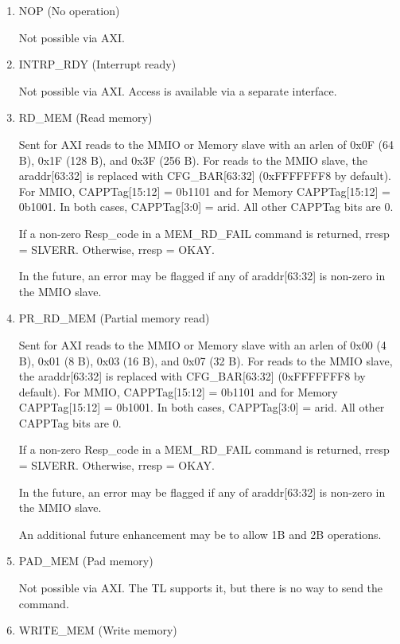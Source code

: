 \begin{enumerate}

\item{NOP (No operation)}

  Not possible via AXI.

\item{INTRP\_RDY (Interrupt ready)}

  Not possible via AXI. Access is available via a separate interface.

\item{RD\_MEM (Read memory)}

  Sent for AXI reads to the MMIO or Memory slave with an arlen of 0x0F
  (64 B), 0x1F (128 B), and 0x3F (256 B). For reads to the MMIO slave,
  the araddr[63:32] is replaced with CFG\_BAR[63:32] (0xFFFFFFF8 by
  default). For MMIO, CAPPTag[15:12] = 0b1101 and for Memory
  CAPPTag[15:12] = 0b1001. In both cases, CAPPTag[3:0] = arid. All
  other CAPPTag bits are 0.

  If a non-zero Resp\_code in a MEM\_RD\_FAIL command is returned,
  rresp = SLVERR. Otherwise, rresp = OKAY.

  In the future, an error may be flagged if any of araddr[63:32] is
  non-zero in the MMIO slave.

\item{PR\_RD\_MEM (Partial memory read)}

  Sent for AXI reads to the MMIO or Memory slave with an arlen of 0x00
  (4 B), 0x01 (8 B), 0x03 (16 B), and 0x07 (32 B). For reads to the
  MMIO slave, the araddr[63:32] is replaced with CFG\_BAR[63:32]
  (0xFFFFFFF8 by default). For MMIO, CAPPTag[15:12] = 0b1101 and for
  Memory CAPPTag[15:12] = 0b1001. In both cases, CAPPTag[3:0] =
  arid. All other CAPPTag bits are 0.

  If a non-zero Resp\_code in a MEM\_RD\_FAIL command is returned,
  rresp = SLVERR. Otherwise, rresp = OKAY.

  In the future, an error may be flagged if any of araddr[63:32] is
  non-zero in the MMIO slave.

  An additional future enhancement may be to allow 1B and 2B
  operations.

\item{PAD\_MEM (Pad memory)}

  Not possible via AXI. The TL supports it, but there is no way to
  send the command.

\item{WRITE\_MEM (Write memory)}


\end{enumerate}
